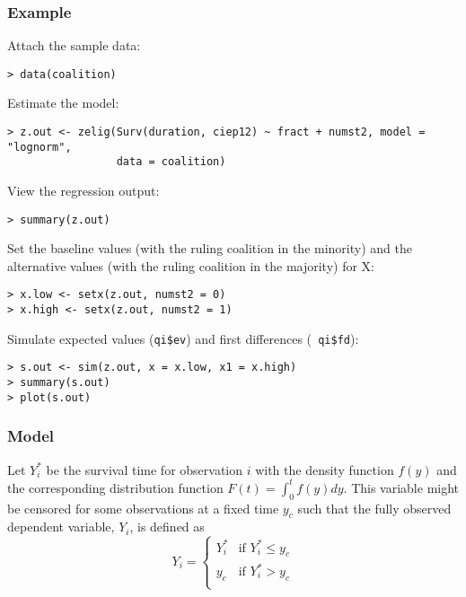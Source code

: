 \subsubsection{Example}

Attach the sample data: 
\begin{verbatim}
> data(coalition)
\end{verbatim}
Estimate the model: 
\begin{verbatim}
> z.out <- zelig(Surv(duration, ciep12) ~ fract + numst2, model = "lognorm",
                 data = coalition)
\end{verbatim}
View the regression output:  
\begin{verbatim}
> summary(z.out)
\end{verbatim}
Set the baseline values (with the ruling coalition in the minority)
and the alternative values (with the ruling coalition in the majority)
for X:
\begin{verbatim}
> x.low <- setx(z.out, numst2 = 0)
> x.high <- setx(z.out, numst2 = 1)
\end{verbatim}
Simulate expected values ({\tt qi\$ev}) and first differences ({\tt
  qi\$fd}):
\begin{verbatim}
> s.out <- sim(z.out, x = x.low, x1 = x.high)
> summary(s.out)
> plot(s.out)
\end{verbatim}

\subsubsection{Model}

Let $Y_i^*$ be the survival time for observation $i$ with the density
function $f(y)$ and the corresponding distribution function
$F(t)=\int_{0}^t f(y) dy$. This variable might be censored for some
observations at a fixed time $y_c$ such that the fully observed
dependent variable, $Y_i$, is defined as
\begin{equation*}
  Y_i = \left\{ \begin{array}{ll}
      Y_i^* & \textrm{if }Y_i^* \leq y_c \\
      y_c & \textrm{if }Y_i^* > y_c \\
    \end{array} \right.
\end{equation*}

